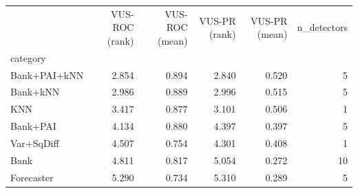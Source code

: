 \begin{tabular}{lrrrrr}
\toprule
 & VUS-ROC (rank) & VUS-ROC (mean) & VUS-PR (rank) & VUS-PR (mean) & n_detectors \\
category &  &  &  &  &  \\
\midrule
Bank+PAI+kNN & 2.854 & 0.894 & 2.840 & 0.520 & 5 \\
Bank+kNN & 2.986 & 0.889 & 2.996 & 0.515 & 5 \\
KNN & 3.417 & 0.877 & 3.101 & 0.506 & 1 \\
Bank+PAI & 4.134 & 0.880 & 4.397 & 0.397 & 5 \\
Var+SqDiff & 4.507 & 0.754 & 4.301 & 0.408 & 1 \\
Bank & 4.811 & 0.817 & 5.054 & 0.272 & 10 \\
Forecaster & 5.290 & 0.734 & 5.310 & 0.289 & 5 \\
\bottomrule
\end{tabular}
